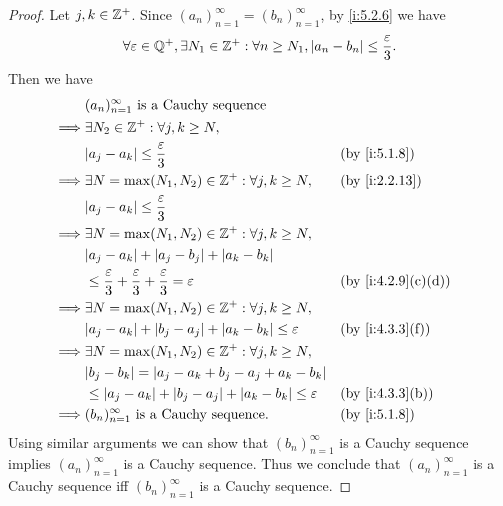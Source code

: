 \begin{proof}
  Let \(j, k \in \mathbb{Z}^+\).
  Since \((a_n)_{n = 1}^\infty = (b_n)_{n = 1}^\infty\), by \cref{i:5.2.6} we have
  \[
    \forall \varepsilon \in \mathbb{Q}^+, \exists N_1 \in \mathbb{Z}^+ : \forall n \geq N_1, \left\lvert a_n - b_n\right\rvert \leq \dfrac{\varepsilon}{3}.
  \]
  Then we have
  \begin{align*}
             & (a_n)_{n = 1}^\infty \text{ is a Cauchy sequence}                                                                  \\
    \implies & \exists N_2 \in \Z^+ : \forall j, k \geq N,                                                                        \\
             & \abs{a_j - a_k} \leq \dfrac{\varepsilon}{3}                                                 &  & \by{i:5.1.8}      \\
    \implies & \exists N = \max(N_1, N_2) \in \Z^+ : \forall j, k \geq N,                                  &  & \by{i:2.2.13}     \\
             & \abs{a_j - a_k} \leq \dfrac{\varepsilon}{3}                                                                        \\
    \implies & \exists N = \max(N_1, N_2) \in \Z^+ : \forall j, k \geq N,                                                         \\
             & \abs{a_j - a_k} + \abs{a_j - b_j} + \abs{a_k - b_k}                                                                \\
             & \leq \dfrac{\varepsilon}{3} + \dfrac{\varepsilon}{3} + \dfrac{\varepsilon}{3} = \varepsilon &  & \by{i:4.2.9}[c,d] \\
    \implies & \exists N = \max(N_1, N_2) \in \Z^+ : \forall j, k \geq N,                                                         \\
             & \abs{a_j - a_k} + \abs{b_j - a_j} + \abs{a_k - b_k} \leq \varepsilon                        &  & \by{i:4.3.3}[f]   \\
    \implies & \exists N = \max(N_1, N_2) \in \Z^+ : \forall j, k \geq N,                                                         \\
             & \abs{b_j - b_k} = \abs{a_j - a_k + b_j - a_j + a_k - b_k}                                                          \\
             & \leq \abs{a_j - a_k} + \abs{b_j - a_j} + \abs{a_k - b_k} \leq \varepsilon                   &  & \by{i:4.3.3}[b]   \\
    \implies & (b_n)_{n = 1}^\infty \text{ is a Cauchy sequence}.                                          &  & \by{i:5.1.8}
  \end{align*}
  Using similar arguments we can show that \((b_n)_{n = 1}^\infty\) is a Cauchy sequence implies \((a_n)_{n = 1}^\infty\) is a Cauchy sequence.
  Thus we conclude that \((a_n)_{n = 1}^\infty\) is a Cauchy sequence iff \((b_n)_{n = 1}^\infty\) is a Cauchy sequence.
\end{proof}


